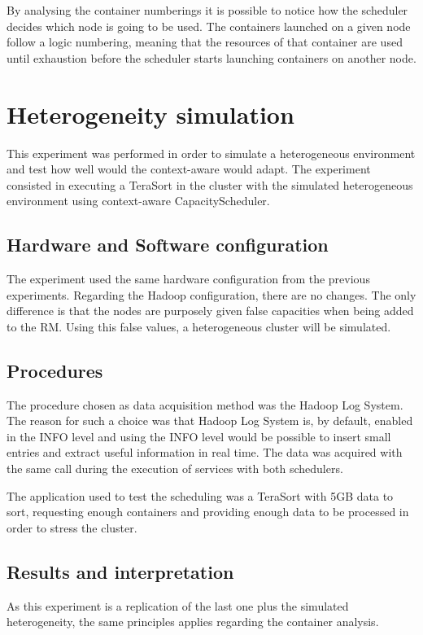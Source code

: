 By analysing the container numberings it is possible to notice how the scheduler decides which node is going to be used. The containers launched on a given node follow a logic numbering, meaning that the resources of that container are used until exhaustion before the scheduler starts launching containers on another node. 

\section{Heterogeneity simulation}
This experiment was performed in order to simulate a heterogeneous environment and test how well would the context-aware would adapt. The experiment consisted in executing a TeraSort in the cluster with the simulated heterogeneous environment using context-aware CapacityScheduler. 

\subsection{Hardware and Software configuration}
The experiment used the same hardware configuration from the previous experiments. Regarding the Hadoop configuration, there are no changes. The only difference is that the nodes are purposely given false capacities when being added to the RM. Using this false values, a heterogeneous cluster will be simulated.

\subsection{Procedures}
The procedure chosen as data acquisition method was the Hadoop Log System. The reason for such a choice was that Hadoop Log System is, by default, enabled in the INFO level and using the INFO level would be possible to insert small entries and extract useful information in real time. The data was acquired with the same call during the execution of services with both schedulers.

The application used to test the scheduling was a TeraSort with 5GB data to sort, requesting enough containers and providing enough data to be processed in order to stress the cluster.

\subsection{Results and interpretation}
As this experiment is a replication of the last one plus the simulated heterogeneity, the same principles applies regarding the container analysis. 

